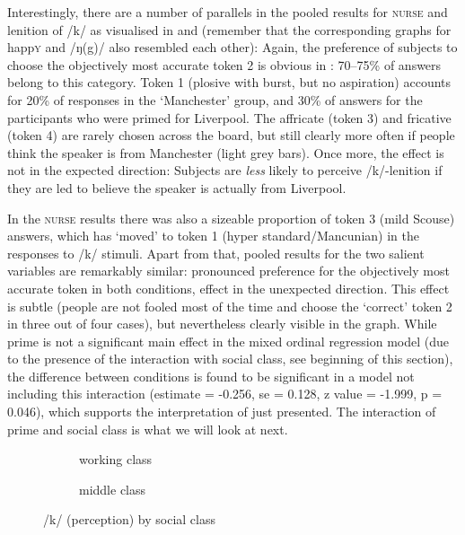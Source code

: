 Interestingly, there are a number of parallels in the pooled results for \textsc{nurse} and lenition of /k/ as visualised in  and  (remember that the corresponding graphs for happ\textsc{y} and /ŋ(g)/ also resembled each other):
Again, the preference of subjects to choose the objectively most accurate token 2 is obvious in : 70--75\% of answers belong to this category.
Token 1 (plosive with burst, but no aspiration) accounts for 20\% of responses in the `Manchester' group, and 30\% of answers for the participants who were primed for Liverpool.
The affricate (token 3) and fricative (token 4) are rarely chosen across the board, but still clearly more often if people think the speaker is from Manchester (light grey bars).
Once more, the  effect is not in the expected direction: Subjects are \emph{less} likely to perceive /k/-lenition if they are led to believe the speaker is actually from Liverpool.

In the \textsc{nurse} results there was also a sizeable proportion of token 3 (mild Scouse) answers, which has `moved' to token 1 (hyper standard/Mancunian) in the responses to /k/ stimuli.
Apart from that, pooled results for the two salient variables are remarkably similar: pronounced preference for the objectively most accurate token in both conditions,  effect in the unexpected direction.
This  effect is subtle (people are not fooled most of the time and choose the `correct' token 2 in three out of four cases), but nevertheless clearly visible in the graph.
While prime is not a significant main effect in the mixed ordinal regression model (due to the presence of the interaction with social class, see beginning of this section), the difference between conditions is found to be significant in a model not including this interaction (estimate = -0.256, se = 0.128, z value = -1.999, p = 0.046), which supports the interpretation of  just presented.
The interaction of prime and social class is what we will look at next.

\begin{figure}
	
	\begin{subfigure}{0.49\textwidth}
		
			\resizebox{\linewidth}{!}{} 
		\caption{working class}
		\label{fig.bar.k.ext.wc}
	\end{subfigure}
	\begin{subfigure}{0.49\textwidth}
		
			\resizebox{\linewidth}{!}{} 
		\caption{middle class}
		\label{fig.bar.k.ext.mc}
	\end{subfigure}
	\caption{/k/ (perception) by social class}
	\label{fig.bar.k.ext.class}
\end{figure}

